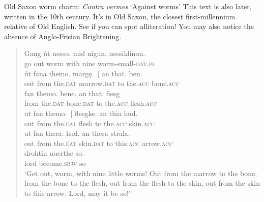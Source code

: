 \begin{texts}{Old Saxon worm charm: \emph{Contra vermes} `Against worms'}
This text is also later, written in the 10th century. It's in Old Saxon, the closest first-millennium relative of Old English. See if you can spot alliteration! You may also notice the absence of Anglo-Frisian Brightening.

\begin{quote}
    \gll Gang út nesso. mid nigun. nessiklinon.\\
    go out worm with nine worm-small-\textsc{dat.pl}\\\newline
    \gll út fana themo. margę.~| an that. ben.\\
    out from the.\textsc{dat} marrow.\textsc{dat}  to the.\textsc{acc} bone.\textsc{acc}\\\newline
    \gll fan themo. bene. an that. flesg\\
    from the.\textsc{dat} bone.\textsc{dat} to the.\textsc{acc} flesh.\textsc{acc}\\\newline
    \gll ut fan themo.~| flesgke. an thia hud.\\
    out from the.\textsc{dat} flesh to the.\textsc{acc} skin.\textsc{acc}\\\newline
    \gll ut fan thera. hud. an thesa strala.\\
    out from the.\textsc{dat} skin.\textsc{dat} to this.\textsc{acc} arrow.\textsc{acc}\\\newline
    \gll drohtin uuerthe so.\\
    lord become.\textsc{sbjv} so\\\newline
    \trans `Get out, worm, with nine little worms! Out from the marrow to the bone, from the bone to the flesh, out from the flesh to the skin, out from the skin to this arrow. Lord, may it be so!'
\end{quote}


\end{texts}


